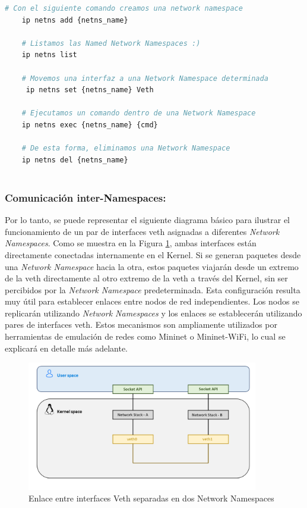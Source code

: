 \begin{lstlisting}[language= bash, style=Consola, caption={Casos de uso de las Netns},label=code:iproute2_ns]
    # Con el siguiente comando creamos una network namespace
    ip netns add {netns_name}
    
    # Listamos las Named Network Namespaces :)
    ip netns list
    
    # Movemos una interfaz a una Network Namespace determinada
     ip netns set {netns_name} Veth
    
    # Ejecutamos un comando dentro de una Network Namespace
    ip netns exec {netns_name} {cmd}
    
    # De esta forma, eliminamos una Network Namespace
    ip netns del {netns_name}
    
\end{lstlisting}
\vspace{0.2cm}

\subsubsection{Comunicación inter-Namespaces: }
\label{linuxVeths}

Por lo tanto, se puede representar el siguiente diagrama básico para ilustrar el funcionamiento de un par de interfaces \gls{veth} asignadas a diferentes \textit{Network Namespaces}. Como se muestra en la Figura \ref{fig:linuxNet_veth}, ambas interfaces están directamente conectadas internamente en el Kernel. Si se generan paquetes desde una \textit{Network Namespace} hacia la otra, estos paquetes viajarán desde un extremo de la \gls{veth} directamente al otro extremo de la \gls{veth} a través del Kernel, sin ser percibidos por la \textit{Network Namespace} predeterminada. Esta configuración resulta muy útil para establecer enlaces entre nodos de red independientes. Los nodos se replicarán utilizando \textit{Network Namespaces} y los enlaces se establecerán utilizando pares de interfaces \gls{veth}. Estos mecanismos son ampliamente utilizados por herramientas de emulación de redes como Mininet o Mininet-WiFi, lo cual se explicará en detalle más adelante.

\begin{figure}[ht]
    \centering
    \includegraphics[width=0.9\textwidth]{archivos/img/teoria/user_kernel.png}
    \caption{Enlace entre interfaces Veth separadas en dos Network Namespaces \cite{carrascal2020diseno}}
    \label{fig:linuxNet_veth}
\end{figure}


